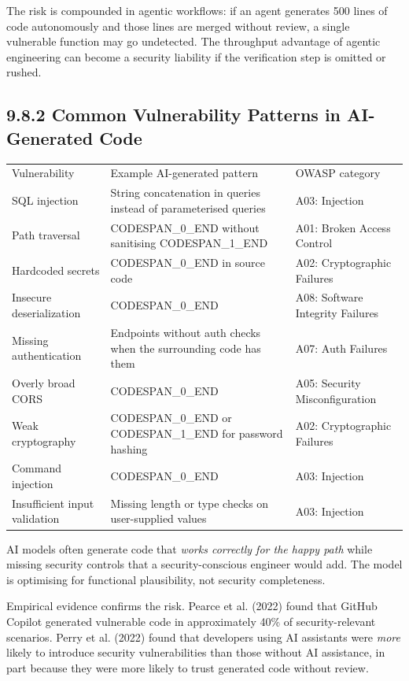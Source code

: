 \documentclass[11pt,a4paper]{book}
\begin{document}
The risk is compounded in agentic workflows: if an agent generates 500 lines of code autonomously and those lines are merged without review, a single vulnerable function may go undetected. The throughput advantage of agentic engineering can become a security liability if the verification step is omitted or rushed.

\subsection{9.8.2 Common Vulnerability Patterns in AI-Generated Code}

\begin{tabular}{lll}
\hline
Vulnerability & Example AI-generated pattern & OWASP category \\
SQL injection & String concatenation in queries instead of parameterised queries & A03: Injection \\
Path traversal & CODESPAN\_0\_END without sanitising CODESPAN\_1\_END & A01: Broken Access Control \\
Hardcoded secrets & CODESPAN\_0\_END in source code & A02: Cryptographic Failures \\
Insecure deserialization & CODESPAN\_0\_END & A08: Software Integrity Failures \\
Missing authentication & Endpoints without auth checks when the surrounding code has them & A07: Auth Failures \\
Overly broad CORS & CODESPAN\_0\_END & A05: Security Misconfiguration \\
Weak cryptography & CODESPAN\_0\_END or CODESPAN\_1\_END for password hashing & A02: Cryptographic Failures \\
Command injection & CODESPAN\_0\_END & A03: Injection \\
Insufficient input validation & Missing length or type checks on user-supplied values & A03: Injection \\
\hline
\end{tabular}

AI models often generate code that \textit{works correctly for the happy path} while missing security controls that a security-conscious engineer would add. The model is optimising for functional plausibility, not security completeness.

Empirical evidence confirms the risk. Pearce et al. (2022) found that GitHub Copilot generated vulnerable code in approximately 40\% of security-relevant scenarios. Perry et al. (2022) found that developers using AI assistants were \textit{more} likely to introduce security vulnerabilities than those without AI assistance, in part because they were more likely to trust generated code without review.
\end{document}
